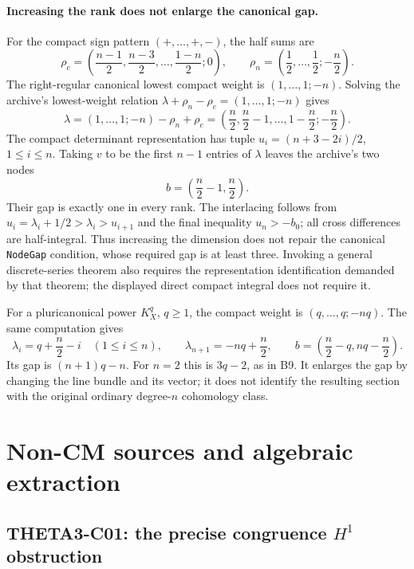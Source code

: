 \documentclass[11pt]{article}
\theoremstyle{definition}\newtheorem{definition}[theorem]{Definition}\newtheorem{remark}[theorem]{Remark}
\begin{document}
\paragraph{Increasing the rank does not enlarge the canonical gap.}
For the compact sign pattern $(+,\ldots,+,-)$, the half sums are
\[
 \rho_c=\left(\frac{n-1}{2},\frac{n-3}{2},\ldots,
                         \frac{1-n}{2};0\right),\qquad
 \rho_n=\left(\frac12,\ldots,\frac12;-\frac n2\right).
\]
The right-regular canonical lowest compact weight is
$(1,\ldots,1;-n)$. Solving the archive's lowest-weight relation
$\lambda+\rho_n-\rho_c=(1,\ldots,1;-n)$ gives
\[
 \lambda=(1,\ldots,1;-n)-\rho_n+\rho_c
       =\left(\frac n2,\frac n2-1,\ldots,
                          1-\frac n2;-\frac n2\right).
\]
The compact determinant representation has tuple
$u_i=(n+3-2i)/2$, $1\leq i\leq n$.
Taking $v$ to be the first $n-1$ entries of $\lambda$ leaves
the archive's two nodes
\[
 b=\left(\frac n2-1,\frac n2\right).
\]
Their gap is exactly one in every rank.
The interlacing follows from
$u_i=\lambda_i+1/2>\lambda_i>u_{i+1}$ and the final inequality
$u_n>-\!b_0$; all cross differences are half-integral.
Thus increasing the dimension does not repair the canonical
\texttt{NodeGap} condition, whose required gap is at least
three. Invoking a general discrete-series theorem also requires
the representation identification demanded by that theorem;
the displayed direct compact integral does not require it.

For a pluricanonical power $K_X^q$, $q\geq1$, the compact weight
is $(q,\ldots,q;-nq)$. The same computation gives
\[
 \lambda_i=q+\frac n2-i\quad(1\leq i\leq n),\qquad
 \lambda_{n+1}=-nq+\frac n2,
 \qquad
 b=\left(\frac n2-q,nq-\frac n2\right).
\]
Its gap is $(n+1)q-n$. For $n=2$ this is $3q-2$, as in B9.
It enlarges the gap by changing the line bundle and its vector;
it does not identify the resulting section with the original
ordinary degree-$n$ cohomology class.


\section{Non-CM sources and algebraic extraction}

\subsection{THETA3-C01: the precise congruence $H^1$ obstruction}\label{C01}
\end{document}
